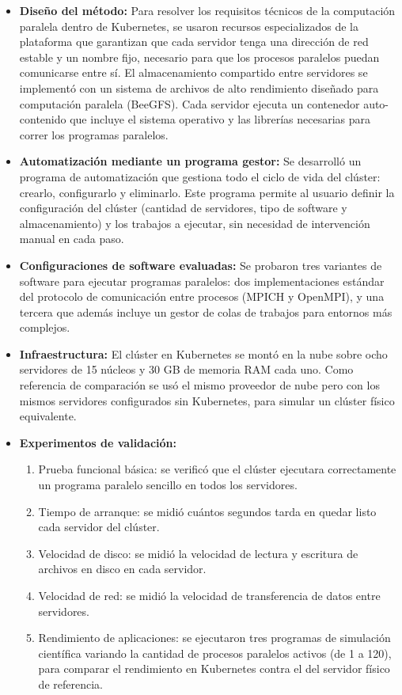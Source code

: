 \begin{itemize}
    \item \textbf{Diseño del método:} Para resolver los requisitos técnicos de la computación paralela dentro de Kubernetes, se usaron recursos especializados de la plataforma que garantizan que cada servidor tenga una dirección de red estable y un nombre fijo, necesario para que los procesos paralelos puedan comunicarse entre sí. El almacenamiento compartido entre servidores se implementó con un sistema de archivos de alto rendimiento diseñado para computación paralela (BeeGFS). Cada servidor ejecuta un contenedor auto-contenido que incluye el sistema operativo y las librerías necesarias para correr los programas paralelos.

    \item \textbf{Automatización mediante un programa gestor:} Se desarrolló un programa de automatización que gestiona todo el ciclo de vida del clúster: crearlo, configurarlo y eliminarlo. Este programa permite al usuario definir la configuración del clúster (cantidad de servidores, tipo de software y almacenamiento) y los trabajos a ejecutar, sin necesidad de intervención manual en cada paso.

    \item \textbf{Configuraciones de software evaluadas:} Se probaron tres variantes de software para ejecutar programas paralelos: dos implementaciones estándar del protocolo de comunicación entre procesos (MPICH y OpenMPI), y una tercera que además incluye un gestor de colas de trabajos para entornos más complejos.

    \item \textbf{Infraestructura:} El clúster en Kubernetes se montó en la nube sobre ocho servidores de 15 núcleos y 30 GB de memoria RAM cada uno. Como referencia de comparación se usó el mismo proveedor de nube pero con los mismos servidores configurados sin Kubernetes, para simular un clúster físico equivalente.

    \item \textbf{Experimentos de validación:}
    \begin{enumerate}
        \item Prueba funcional básica: se verificó que el clúster ejecutara correctamente un programa paralelo sencillo en todos los servidores.
        \item Tiempo de arranque: se midió cuántos segundos tarda en quedar listo cada servidor del clúster.
        \item Velocidad de disco: se midió la velocidad de lectura y escritura de archivos en disco en cada servidor.
        \item Velocidad de red: se midió la velocidad de transferencia de datos entre servidores.
        \item Rendimiento de aplicaciones: se ejecutaron tres programas de simulación científica variando la cantidad de procesos paralelos activos (de 1 a 120), para comparar el rendimiento en Kubernetes contra el del servidor físico de referencia.
    \end{enumerate}
\end{itemize}

